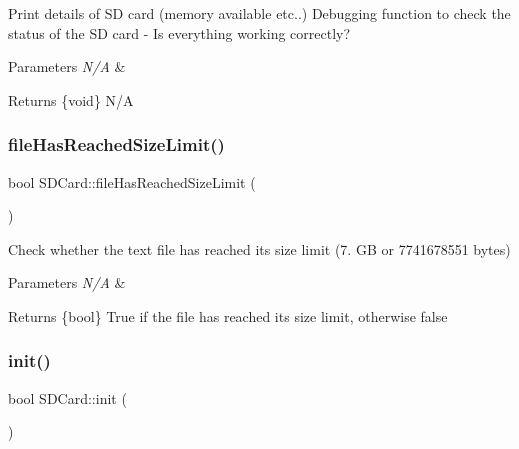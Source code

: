 Print details of SD card (memory available etc..) Debugging function to check the status of the SD card -\/ Is everything working correctly? 
\begin{DoxyParams}{Parameters}
{\em N/A} & \\
\hline
\end{DoxyParams}
\begin{DoxyReturn}{Returns}
\{void\} N/A 
\end{DoxyReturn}
\mbox{\label{class_s_d_card_ab43bfe585365622d71e30194a404125c}} 
\subsubsection{\texorpdfstring{file\+Has\+Reached\+Size\+Limit()}{fileHasReachedSizeLimit()}}
{\footnotesize\ttfamily bool S\+D\+Card\+::file\+Has\+Reached\+Size\+Limit (\begin{DoxyParamCaption}{ }\end{DoxyParamCaption})}

Check whether the text file has reached its size limit (7. GB or 7741678551 bytes) 
\begin{DoxyParams}{Parameters}
{\em N/A} & \\
\hline
\end{DoxyParams}
\begin{DoxyReturn}{Returns}
\{bool\} True if the file has reached its size limit, otherwise false 
\end{DoxyReturn}
\mbox{\label{class_s_d_card_a7d5b2551a395d7bf883f425fb98b0b0d}} 
\subsubsection{\texorpdfstring{init()}{init()}}
{\footnotesize\ttfamily bool S\+D\+Card\+::init (\begin{DoxyParamCaption}{ }\end{DoxyParamCaption})}

\mbox{\label{class_s_d_card_a9c0edb3dd7e157501776d9760705a757}} 
